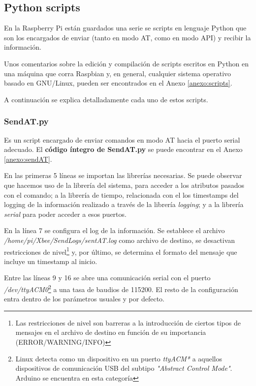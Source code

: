 \subsection{Python scripts}

En la Raspberry Pi están guardados una serie se scripts en lenguaje Python que son los encargados de enviar (tanto en modo AT, como en modo API) y recibir la información.

Unos comentarios sobre la edición y compilación de scripts escritos en Python en una máquina que corra Raspbian y, en general, cualquier sistema operativo basado en GNU/Linux, pueden ser encontrados en el Anexo \ref{anexo:scripts}.

A continuación se explica detalladamente cada uno de estos scripts.

\subsubsection{SendAT.py}\label{subsubsec:sendat}

Es un script encargado de enviar comandos en modo AT hacia el puerto serial adecuado. El \textbf{código íntegro de SendAT.py} se puede encontrar en el Anexo \ref{anexo:sendAT}.

En las primeras 5 líneas se importan las librerías necesarias. Se puede observar que hacemos uso de la librería del sistema, para acceder a los atributos pasados con el comando; a la librería de tiempo, relacionada con el los timestamps del logging de la información realizado a través de la librería \textit{logging}; y a la librería \textit{serial} para poder acceder a esos puertos.

En la línea 7 se configura el log de la información. Se establece el archivo \textit{/home/pi/Xbee/SendLogs/sentAT.log} como archivo de destino, se desactivan restricciones de nivel\footnote{Las restricciones de nivel son barreras a la introducción de ciertos tipos de mensajes en el archivo de destino en función de su importancia (ERROR/WARNING/INFO)} y, por último, se determina el formato del mensaje que incluye un timestamp al inicio.

Entre las líneas 9 y 16 se abre una comunicación serial con el puerto \textit{/dev/ttyACM0}\footnote{Linux detecta como un dispositivo en un puerto \textit{ttyACM*} a aquellos dispositivos de comunicación USB del subtipo \textit{"Abstract Control Mode"}. Arduino se encuentra en esta categoría} a una tasa de baudios de 115200. El resto de la configuración entra dentro de los parámetros usuales y por defecto.

